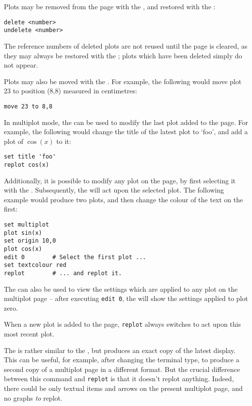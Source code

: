 Plots may be removed from the page with the , and restored with
the :

\begin{verbatim} 
delete <number>
undelete <number>
\end{verbatim}

The reference numbers of deleted plots are not reused until the page is
cleared, as they may always be restored with the ; plots
which have been deleted simply do not appear.

Plots may also be moved with the . For example, the following
would move plot 23 to position (8,8) measured in centimetres:

\begin{verbatim} 
move 23 to 8,8
\end{verbatim}

In multiplot mode, the  can be used to modify the last plot
added to the page. For example, the following would change the title of the
latest plot to `foo', and add a plot of $\cos(x)$ to it:

\begin{verbatim} 
set title 'foo'
replot cos(x)
\end{verbatim}

Additionally, it is possible to modify any plot on the page, by first selecting
it with the . Subsequently, the  will act upon
the selected plot. The following example would produce two plots, and then
change the colour of the text on the first:

\begin{verbatim} 
set multiplot
plot sin(x)
set origin 10,0
plot cos(x)
edit 0        # Select the first plot ...
set textcolour red
replot        # ... and replot it.
\end{verbatim}

The  can also be used to view the settings which are applied to
any plot on the multiplot page -- after executing {\tt edit~0}, the
 will show the settings applied to plot zero.

When a new plot is added to the page, {\tt replot} always switches to act
upon this most recent plot.

 The  is rather similar to the
, but produces an exact copy of the latest display. This can be
useful, for example, after changing the terminal type, to produce a second copy
of a multiplot page in a different format. But the crucial difference between
this command and {\tt replot} is that it doesn't replot anything. Indeed, there
could be only textual items and arrows on the present multiplot page, and no
graphs \textit{to} replot.

